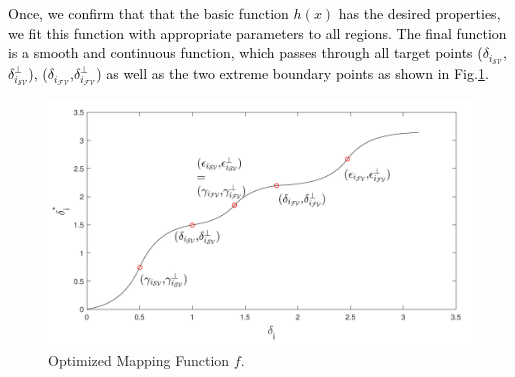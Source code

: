 \textcolor{black}{Once, we confirm that that the basic function $h(x)$ has the desired properties, we fit this function with appropriate parameters to all regions. The final function is a smooth and continuous function, which passes through all target points ($\delta_{i_{{\mathcal{SV}}}}$,$\delta^{\perp}_{i_{{\mathcal{SV}}}}$), ($\delta_{i_{{\mathcal{FV}}}}$,$\delta^{\perp}_{i_{{\mathcal{FV}}}}$) as well as the two extreme boundary points as shown in Fig.\ref{fig:optimized_map}.}





\begin{figure}[t]
\centering
\includegraphics[scale=.7]{Fig/optimized_mapping_f.pdf}
\caption{Optimized Mapping Function $f$.}
\label{fig:optimized_map}
\end{figure}

